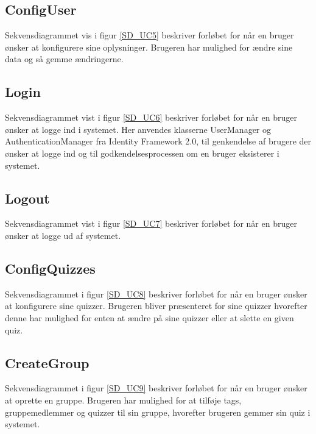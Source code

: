 
\subsection*{ConfigUser}
Sekvensdiagrammet vis i figur \ref{SD_UC5} beskriver forløbet for når en bruger ønsker at konfigurere sine oplysninger. Brugeren har mulighed for ændre sine data og så gemme ændringerne.


\subsection*{Login}
Sekvensdiagrammet vist i figur \ref{SD_UC6} beskriver forløbet for når en bruger ønsker at logge ind i systemet. Her anvendes klasserne UserManager og AuthenticationManager fra Identity Framework 2.0, til genkendelse af brugere der ønsker at logge ind og til godkendelsesprocessen om en bruger eksisterer i systemet.


\subsection*{Logout}
Sekvensdiagrammet vist i figur \ref{SD_UC7} beskriver forløbet for når en bruger ønsker at logge ud af systemet.


\subsection*{ConfigQuizzes}
Sekvensdiagrammet i figur \ref{SD_UC8} beskriver forløbet for når en bruger ønsker at konfigurere sine quizzer. Brugeren bliver præsenteret for sine quizzer hvorefter denne har mulighed for enten at ændre på sine quizzer eller at slette en given quiz.


\subsection*{CreateGroup}
Sekvensdiagrammet i figur \ref{SD_UC9} beskriver forløbet for når en bruger ønsker at oprette en gruppe. Brugeren har mulighed for at tilføje tags, gruppemedlemmer og quizzer til sin gruppe, hvorefter brugeren gemmer sin quiz i systemet.

